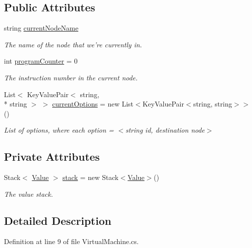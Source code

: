 \subsection*{Public Attributes}
\begin{DoxyCompactItemize}
\item 
string \hyperlink{a00159_a86f481fad527f719b49f8fee6ff79764}{current\-Node\-Name}
\begin{DoxyCompactList}\small\item\em The name of the node that we're currently in. \end{DoxyCompactList}\item 
int \hyperlink{a00159_a2c76546b54b4fb573d7f14d79ce230a3}{program\-Counter} = 0
\begin{DoxyCompactList}\small\item\em The instruction number in the current node. \end{DoxyCompactList}\item 
List$<$ Key\-Value\-Pair$<$ string, \\*
string $>$ $>$ \hyperlink{a00159_ab816dfea32ecda23282700f01454e0a9}{current\-Options} = new List$<$Key\-Value\-Pair$<$string, string$>$$>$()
\begin{DoxyCompactList}\small\item\em List of options, where each option = $<$string id, destination node$>$ \end{DoxyCompactList}\end{DoxyCompactItemize}
\subsection*{Private Attributes}
\begin{DoxyCompactItemize}
\item 
Stack$<$ \hyperlink{a00181}{Value} $>$ \hyperlink{a00159_a0bc84abf38b3ff31cbb47363b851c233}{stack} = new Stack$<$\hyperlink{a00181}{Value}$>$()
\begin{DoxyCompactList}\small\item\em The value stack. \end{DoxyCompactList}\end{DoxyCompactItemize}


\subsection{Detailed Description}


Definition at line 9 of file Virtual\-Machine.\-cs.



